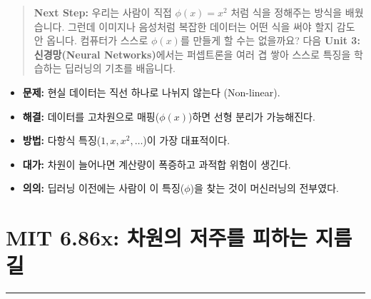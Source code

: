 \documentclass[11pt,a4paper]{book}
\theoremstyle{definition}
\begin{document}
\vspace{1cm}
\begin{quote}
\textbf{Next Step:} 우리는 사람이 직접 $\phi(x) = x^2$ 처럼 식을 정해주는 방식을 배웠습니다. 그런데 이미지나 음성처럼 복잡한 데이터는 어떤 식을 써야 할지 감도 안 옵니다. 컴퓨터가 스스로 $\phi(x)$를 만들게 할 수는 없을까요? 다음 \textbf{Unit 3: 신경망(Neural Networks)}에서는 퍼셉트론을 여러 겹 쌓아 스스로 특징을 학습하는 딥러닝의 기초를 배웁니다.
\end{quote}

\begin{summarybox}[title={Unit 2 (Part B) 핵심 요약}]
\begin{itemize}
    \item \textbf{문제:} 현실 데이터는 직선 하나로 나뉘지 않는다 (Non-linear).
    \item \textbf{해결:} 데이터를 고차원으로 매핑($\phi(x)$)하면 선형 분리가 가능해진다.
    \item \textbf{방법:} 다항식 특징($1, x, x^2, \dots$)이 가장 대표적이다.
    \item \textbf{대가:} 차원이 늘어나면 계산량이 폭증하고 과적합 위험이 생긴다.
    \item \textbf{의의:} 딥러닝 이전에는 사람이 이 특징($\phi$)을 찾는 것이 머신러닝의 전부였다.
\end{itemize}
\end{summarybox}


\chapter{MIT 6.86x: 차원의 저주를 피하는 지름길}
\label{ch:lecture6}


\vspace{1cm}
\hrule
\vspace{1cm}
\end{document}
